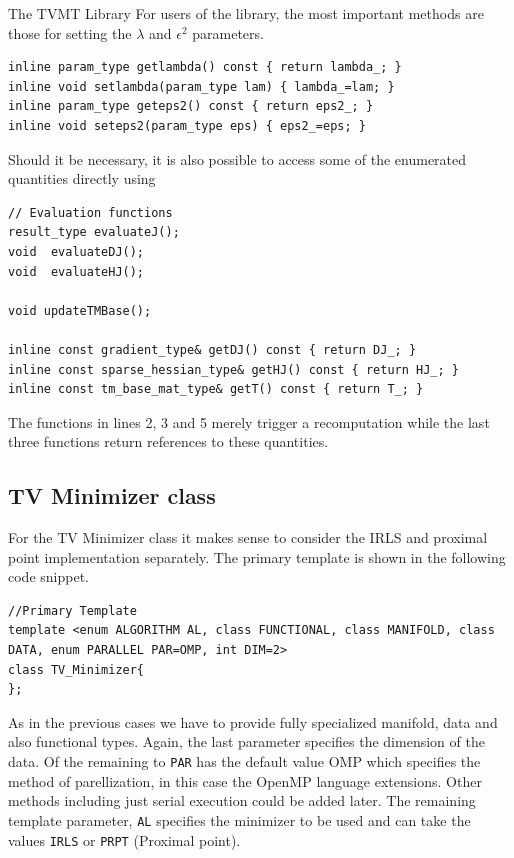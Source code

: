 \begin{chapter}{The TVMT Library}
For users of the library, the most important methods are those for setting the $\lambda$ and $\epsilon^2$ parameters.
\cppinline
\begin{lstlisting}
inline param_type getlambda() const { return lambda_; }
inline void setlambda(param_type lam) { lambda_=lam; }
inline param_type geteps2() const { return eps2_; }
inline void seteps2(param_type eps) { eps2_=eps; }
\end{lstlisting}

Should it be necessary, it is also possible to access some of the enumerated quantities directly using
\cppinline
\begin{lstlisting}
// Evaluation functions
result_type evaluateJ();
void  evaluateDJ();
void  evaluateHJ();
 
void updateTMBase();

inline const gradient_type& getDJ() const { return DJ_; }
inline const sparse_hessian_type& getHJ() const { return HJ_; }
inline const tm_base_mat_type& getT() const { return T_; }
\end{lstlisting}
The functions in lines 2, 3 and 5 merely trigger a recomputation while the last three functions return references to these quantities.



\subsection{TV Minimizer class} %
\label{sub:TVMinimizer class}
For the TV Minimizer class it makes sense to consider the IRLS and proximal point implementation separately. The primary template is shown in the following code snippet.
\cppinline
\begin{lstlisting}
//Primary Template 
template <enum ALGORITHM AL, class FUNCTIONAL, class MANIFOLD, class DATA, enum PARALLEL PAR=OMP, int DIM=2>
class TV_Minimizer{ 
};
\end{lstlisting}
As in the previous cases we have to provide fully specialized manifold, data and also functional types. Again, the last parameter specifies the dimension of the data. Of the
remaining to \texttt{PAR} has the default value OMP which specifies the method of parellization, in this case the OpenMP language extensions. Other methods including just serial
execution could be added later. The remaining template parameter, \texttt{AL} specifies the minimizer to be used and can take the values \texttt{IRLS} or \texttt{PRPT} (Proximal point).\\


\end{chapter}
